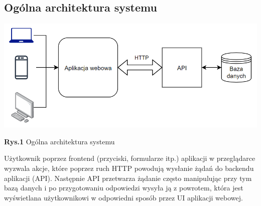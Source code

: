 \documentclass{article}
\begin{document}
\subsection{Ogólna architektura systemu}
\hspace*{-3cm}\includegraphics[scale=0.8]{architecture}
\begin{center}\textbf{Rys.1} Ogólna architektura systemu \end{center}
Użytkownik poprzez frontend (przyciski, formularze itp.) aplikacji w przeglądarce wyzwala akcje, które poprzez ruch HTTP powodują wysłanie żądań do backendu aplikacji (API). Następnie API przetwarza żądanie często manipulując przy tym bazą danych i po przygotowaniu odpowiedzi wysyła ją z powrotem, która jest wyświetlana użytkownikowi w odpowiedni sposób przez UI aplikacji webowej.
\end{document}
